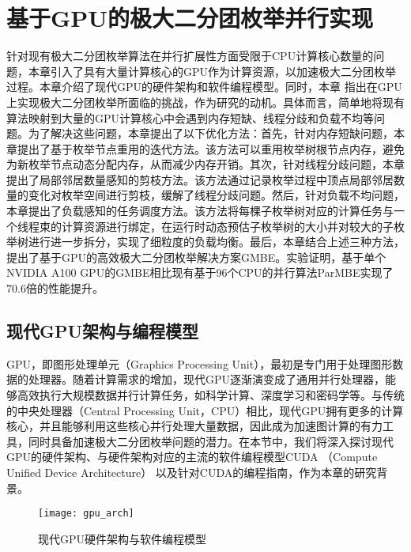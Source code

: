 \chapter{基于GPU的极大二分团枚举并行实现}
\label{ch:gmbe}

针对现有极大二分团枚举算法在并行扩展性方面受限于CPU计算核心数量的问题，本章引入了具有大量计算核心的GPU作为计算资源，以加速极大二分团枚举过程。本章介绍了现代GPU的硬件架构和软件编程模型。同时，本章%
指出在GPU上实现极大二分团枚举所面临的挑战，作为研究的动机。具体而言，简单地将现有算法映射到大量的GPU计算核心中会遇到内存短缺、线程分歧和负载不均等问题。为了解决这些问题，本章提出了以下优化方法：首先，针对内存短缺问题，本章提出了基于枚举节点重用的迭代方法。该方法可以重用枚举树根节点内存，避免为新枚举节点动态分配内存，从而减少内存开销。其次，针对线程分歧问题，本章提出了局部邻居数量感知的剪枝方法。该方法通过记录枚举过程中顶点局部邻居数量的变化对枚举空间进行剪枝，缓解了线程分歧问题。然后，针对负载不均问题，本章提出了负载感知的任务调度方法。该方法将每棵子枚举树对应的计算任务与一个线程束的计算资源进行绑定，在运行时动态预估子枚举树的大小并对较大的子枚举树进行进一步拆分，实现了细粒度的负载均衡。最后，本章结合上述三种方法，提出了基于GPU的高效极大二分团枚举解决方案GMBE。实验证明，基于单个NVIDIA A100 GPU的GMBE相比现有基于96个CPU的并行算法ParMBE实现了70.6倍的性能提升。

\section{现代GPU架构与编程模型} 
\label{sec:gpu_arch}
GPU，即图形处理单元（Graphics Processing Unit），最初是专门用于处理图形数据的处理器。随着计算需求的增加，现代GPU逐渐演变成了通用并行处理器，能够高效执行大规模数据并行计算任务，如科学计算、深度学习和密码学等。与传统的中央处理器（Central Processing Unit，CPU）相比，现代GPU拥有更多的计算核心，并且能够利用这些核心并行处理大量数据，因此成为加速图计算的有力工具，同时具备加速极大二分团枚举问题的潜力。在本节中，我们将深入探讨现代GPU的硬件架构、与硬件架构对应的主流的软件编程模型CUDA （Compute Unified Device Architecture） 以及针对CUDA的编程指南，作为本章的研究背景。

\begin{figure} [t]
  \center
		\texttt{[image: gpu\_arch]}
     \vspace{-0.1in}
	\caption{现代GPU硬件架构与软件编程模型}
	\label{fig:gpu}
\end{figure}

